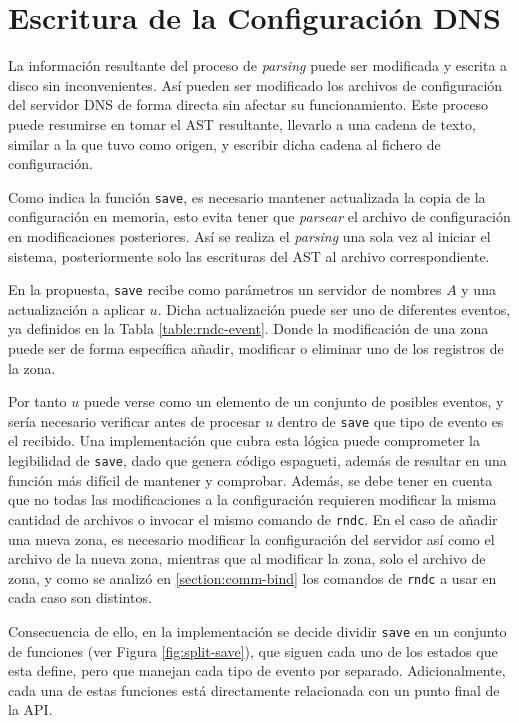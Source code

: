 \section{Escritura de la Configuración DNS}

La información resultante del proceso de \textit{parsing} puede ser modificada y escrita a disco sin inconvenientes. Así pueden ser modificado los archivos de configuración del servidor DNS de forma directa sin afectar su funcionamiento. Este proceso puede resumirse en tomar el AST resultante, llevarlo a una cadena de texto, similar a la que tuvo como origen, y escribir dicha cadena al fichero de configuración.

Como indica la función \verb+save+, es necesario mantener actualizada la copia de la configuración en memoria, esto evita tener que \textit{parsear} el archivo de configuración en modificaciones posteriores. Así se realiza el \textit{parsing} una sola vez al iniciar el sistema, posteriormente solo las escrituras del AST al archivo correspondiente.

En la propuesta, \verb|save| recibe como parámetros un servidor de nombres $A$ y una actualización a aplicar $u$. Dicha actualización puede ser uno de diferentes eventos, ya definidos en la Tabla \ref{table:rndc-event}. Donde la modificación de una zona puede ser de forma específica añadir, modificar o eliminar uno de los registros de la zona.

Por tanto $u$ puede verse como un elemento de un conjunto de posibles eventos, y sería necesario verificar antes de procesar $u$ dentro de \verb|save| que tipo de evento es el recibido. Una implementación que cubra esta lógica puede comprometer la legibilidad de \verb|save|, dado que genera código espagueti, además de resultar en una función más difícil de mantener y comprobar. Además, se debe tener en cuenta que no todas las modificaciones a la configuración requieren modificar la misma cantidad de archivos o invocar el mismo comando de \verb|rndc|. En el caso de añadir una nueva zona, es necesario modificar la configuración del servidor así como el archivo de la nueva zona, mientras que al modificar la zona, solo el archivo de zona, y como se analizó en \ref{section:comm-bind} los comandos de \verb|rndc| a usar en cada caso son distintos.

Consecuencia de ello, en la implementación se decide dividir \verb|save| en un conjunto de funciones (ver Figura \ref{fig:split-save}), que siguen cada uno de los estados que esta define, pero que manejan cada tipo de evento por separado. Adicionalmente, cada una de estas funciones está directamente relacionada con un punto final de la API.

